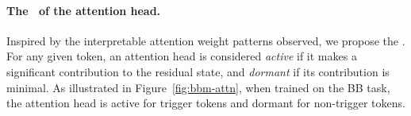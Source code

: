 
\paragraph{The \activedormant~of the attention head.} Inspired by the interpretable attention weight patterns observed, we propose the \textit{\activedormant}. For any given token, an attention head is considered \textit{active} if it makes a significant contribution to the residual state, and \textit{dormant} if its contribution is minimal. As illustrated in Figure~\ref{fig:bbm-attn}, when trained on the BB task, the attention head is active for trigger tokens and dormant for non-trigger tokens. 

